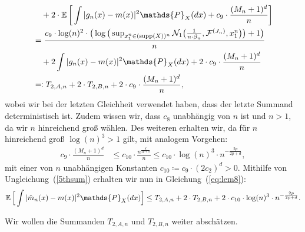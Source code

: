 {\begin{equation}
\begin{split}
& \quad + 2 \cdot \E\bigg[\int |g_{n}(x) - m(x)|^2 \mathds{P}_X(dx) + c_9 \cdot \frac{(M_n + 1)^d}{n}\bigg] \\
& = \frac{c_9 \cdot \log(n)^2 \cdot \big(\log\big(\sup_{x_1^n \in (\supp(X))^n}\mathcal{N}_1\big(\frac{1}{n \cdot \beta_n},\mathcal{F}^{(J_n)},x_1^n\big)\big) + 1\big)}{n} \\
& \quad + 2 \int |g_{n}(x) - m(x)|^2 \mathds{P}_X(dx) + 2 \cdot c_9 \cdot \frac{(M_n + 1)^d}{n} \\
& \eqqcolon T_{2,A,n} + 2 \cdot T_{2,B,n} + 2 \cdot c_9 \cdot \frac{(M_n + 1)^d}{n},
\end{split}
\end{equation}
wobei wir bei der letzten Gleichheit verwendet haben, dass der letzte Summand deterministisch ist. Zudem wissen wir, dass $c_8$ unabhängig von $n$ ist und $n > 1$, da wir $n$ hinreichend groß wählen.
Des weiteren erhalten wir, da für $n$ hinreichend groß $\log(n)^3 > 1$ gilt, mit analogem Vorgehen:
\begin{equation}
\label{5thsum}
\begin{split}
c_9 \cdot \frac{(M_n + 1)^d}{n} & \leq c_{10} \cdot \frac{n^{\frac{d}{2p + d}}}{n} \leq c_{10} \cdot \log(n)^3 \cdot n^{- \frac{2p}{2p + d}} ,
\end{split}
\end{equation} 
mit einer von $n$ unabhängigen Konstanten $c_{10} \coloneqq c_9 \cdot (2c_2)^d > 0$.
Mithilfe von Ungleichung~(\ref{5thsum}) erhalten wir nun in Gleichung~(\ref{eq:lem8}):
$$
\E \Big[\int |\hat{m}_n(x) - m(x)|^2 \mathds{P}_X(dx)\Big] \leq T_{2,A,n} + 2 \cdot T_{2,B,n} + 2 \cdot c_{10} \cdot \log(n)^3 \cdot n^{- \frac{2p}{2p + d}}.
$$

Wir wollen die Summanden $T_{2,A,n}$ und $T_{2,B,n}$ weiter abschätzen.

}
